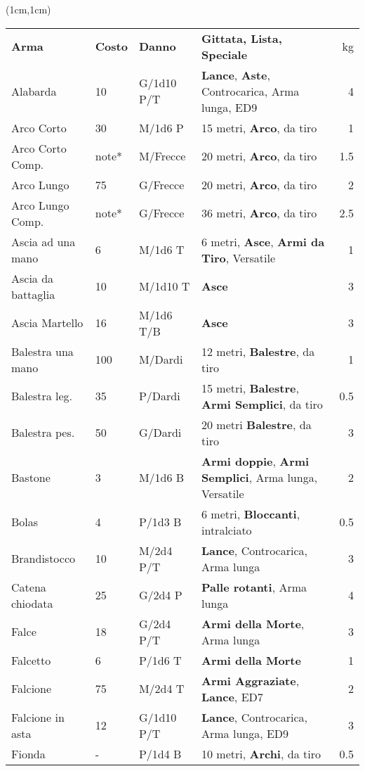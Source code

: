 \documentclass[a4paper,12 pt,openany]{book}
\begin{document}
	
	\begin{textblock*}{19cm}(1cm,1cm) %
		\footnotesize 	
		\begin{xltabular}{1\textwidth}{lllXr}
			\textbf{Arma}&\textbf{Costo}&\textbf{Danno} & \textbf{Gittata, Lista, Speciale} & kg\\
			Alabarda& 10 & G/1d10 P/T& \textbf{Lance}, \textbf{Aste}, Controcarica, Arma lunga, ED9 & 4\\
			Arco Corto& 30 & M/1d6 P& 15 metri, \textbf{Arco}, da tiro& 1\\
			Arco Corto Comp.& note*& M/Frecce& 20 metri, \textbf{Arco}, da tiro& 1.5\\
			Arco Lungo& 75 & G/Frecce& 20 metri, \textbf{Arco}, da tiro& 2\\
			Arco Lungo Comp.& note*& G/Frecce& 36 metri, \textbf{Arco}, da tiro& 2.5\\
			Ascia ad una mano& 6  & M/1d6 T& 6 metri, \textbf{Asce}, \textbf{Armi da Tiro}, Versatile& 1\\
			Ascia da battaglia& 10 & M/1d10 T&\textbf{Asce}& 3\\
			Ascia Martello& 16 & M/1d6 T/B& \textbf{Asce}& 3\\
			Balestra una mano& 100& M/Dardi& 12 metri, \textbf{Balestre}, da tiro& 1\\
			Balestra leg.& 35 & P/Dardi& 15 metri, \textbf{Balestre}, \textbf{Armi Semplici}, da tiro& 0.5\\
			Balestra pes.& 50 & G/Dardi& 20 metri \textbf{Balestre}, da tiro& 3\\
			Bastone& 3& M/1d6 B& \textbf{Armi doppie}, \textbf{Armi Semplici}, Arma lunga, Versatile& 2\\
			Bolas& 4& P/1d3 B&6 metri, \textbf{Bloccanti}, intralciato& 0.5\\
			Brandistocco& 10 & M/2d4 P/T& \textbf{Lance}, Controcarica, Arma lunga& 3\\
			Catena chiodata& 25 & G/2d4 P& \textbf{Palle rotanti}, Arma lunga& 4\\
			Falce& 18 & G/2d4 P/T& \textbf{Armi della Morte}, Arma lunga& 3\\
			Falcetto& 6& P/1d6 T& \textbf{Armi della Morte} & 1\\
			Falcione& 75 & M/2d4 T& \textbf{Armi Aggraziate}, \textbf{Lance}, ED7& 2\\
			Falcione in asta& 12 & G/1d10 P/T& \textbf{Lance}, Controcarica, Arma lunga, ED9& 3\\
			Fionda& -& P/1d4 B& 10 metri, \textbf{Archi}, da tiro& 0.5\\

\end{xltabular}
\end{textblock*}
\end{document}
